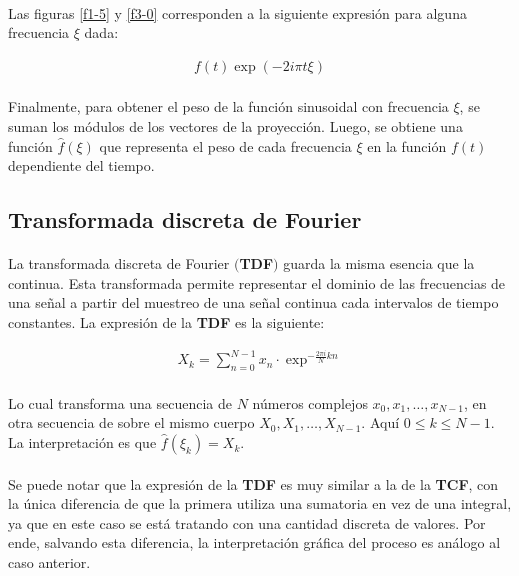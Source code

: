 \documentclass[12pt, twocolumn]{article}
\begin{document}
	\paragraph{} Las figuras \ref{f1-5} y \ref{f3-0} corresponden a la siguiente expresión para alguna frecuencia $\xi$ dada:
	
	\begin{align}
		f(t)\exp(-2i\pi t \xi)
	\end{align}
	
	\paragraph{}Finalmente, para obtener el peso de la función sinusoidal con frecuencia $\xi$, se suman los módulos de los vectores de la proyección. Luego, se obtiene una función $\hat{f}(\xi)$ que representa el peso de cada frecuencia $\xi$ en la función $f(t)$ dependiente del tiempo.
	
	\subsection{Transformada discreta de Fourier}
	
	\paragraph{} La transformada discreta de Fourier $($\textbf{TDF}$)$ guarda la misma esencia que la continua. Esta transformada permite representar el dominio de las frecuencias de una señal a partir del muestreo de una señal continua cada intervalos de tiempo constantes. La expresión de la \textbf{TDF} es la siguiente:  
	
	\begin{align}
		X_{k} = \sum_{n=0}^{N-1}x_{n}\cdot\exp^{-\frac{2\pi i}{N}k n}
	\end{align}
	
	\paragraph{} Lo cual transforma una secuencia de $N$ números complejos $x_{0},x_{1},\dots,x_{N-1}$, en otra secuencia de sobre el mismo cuerpo $X_{0},X_{1},\dots,X_{N-1}$. Aquí $0\le k\le N-1$. La interpretación es que $\hat{f}(\xi_{k})=X_{k}$.
	
	\paragraph{} Se puede notar que la expresión de la \textbf{TDF} es muy similar a la de la \textbf{TCF}, con la única diferencia de que la primera utiliza una sumatoria en vez de una integral, ya que en este caso se está tratando con una cantidad discreta de valores. Por ende, salvando esta diferencia, la interpretación gráfica del proceso es análogo al caso anterior.
	
\end{document}
